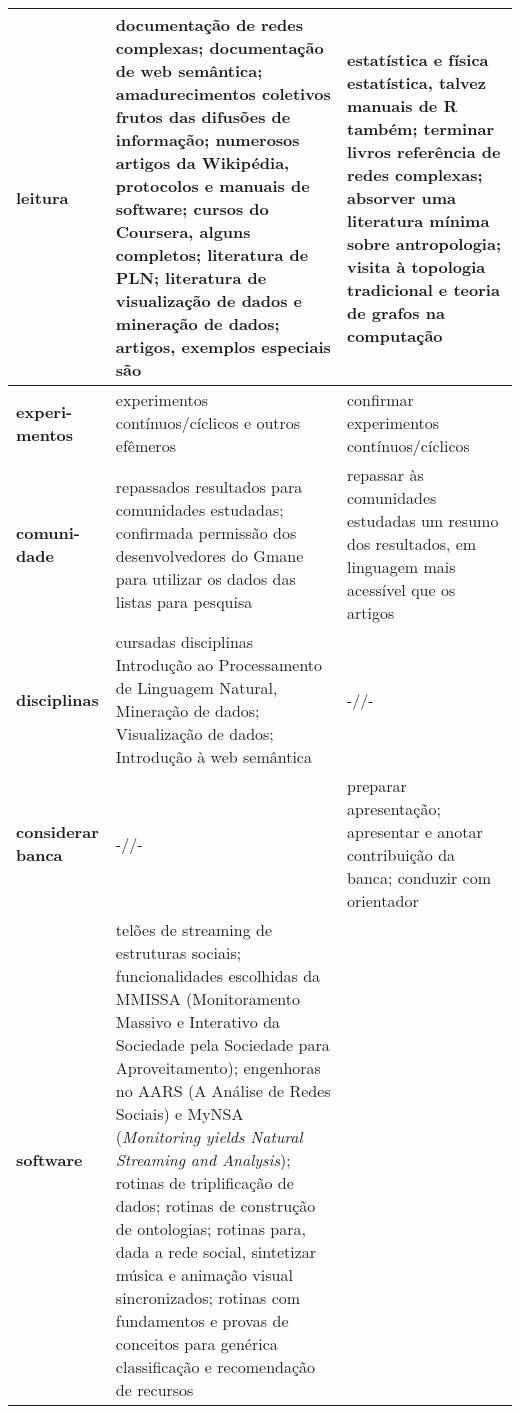 \documentclass[a4paper,openright,12pt]{report} %
\begin{document}
\begin{table}[h]
\begin{tabular}{p{1.3cm}||p{7.6cm}|p{7.1cm}}
    {\bf leitura }     & documentação de redes complexas;
            documentação de web semântica;
            amadurecimentos coletivos frutos das difusões de informação;
                   numerosos artigos da Wikipédia, protocolos e manuais de software;
               cursos do Coursera, alguns completos;
               literatura de PLN;
               literatura de visualização de dados e mineração de dados;
               artigos, exemplos especiais são~\cite{newmanPower,barabasiEvo,newmanCommunity2013,barabasiHumanDyn} & 
                               estatística e física estatística, talvez manuais de R também;
                       terminar livros referência de redes complexas;
                       absorver uma literatura mínima sobre antropologia;
                       visita à topologia tradicional e teoria de grafos na computação \\\hline\hline
                       {\bf experi-mentos} & experimentos contínuos/cíclicos e outros efêmeros  & confirmar experimentos contínuos/cíclicos \\\hline
                       {\bf comuni-dade  }& repassados resultados para comunidades estudadas;
                       confirmada permissão dos desenvolvedores
                      do Gmane para utilizar os dados das listas para pesquisa
                        & repassar às comunidades estudadas um resumo dos resultados, em linguagem mais acessível que os artigos \\\hline
                      {\bf disciplinas} & cursadas disciplinas Introdução ao Processamento de Linguagem Natural,
                       Mineração de dados;
                       Visualização de dados;
                       Introdução à web semântica & -//- \\\hline
                       {\bf considerar banca} & -//-  & preparar apresentação; apresentar e anotar contribuição da banca; conduzir com orientador \\\hline
                       {\bf software}     & telões de streaming de estruturas sociais;
    funcionalidades escolhidas da MMISSA (Monitoramento Massivo e Interativo da Sociedade pela Sociedade para Aproveitamento);
    engenhoras no AARS (A Análise de Redes Sociais) e MyNSA (\emph{Monitoring yields Natural Streaming and Analysis});
                       rotinas de triplificação de dados; rotinas de construção de ontologias;
                       rotinas para, dada a rede social, sintetizar música e animação visual sincronizados;
                       rotinas com fundamentos e provas de conceitos para genérica classificação e recomendação de recursos

\end{tabular}
\end{table}
\end{document}
